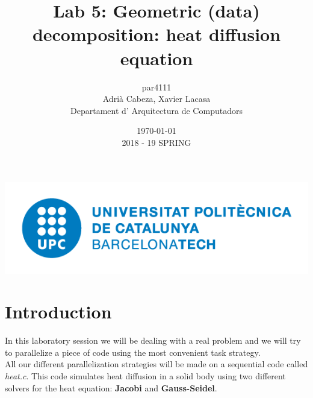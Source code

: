 \documentclass[12]{article}
\author{par4111 \\ Adrià Cabeza, Xavier Lacasa \\ Departament d' Arquitectura de Computadors}
\title{Lab 5: Geometric (data) decomposition: heat diffusion equation}
\date{\today \\ 2018 - 19 SPRING}
\begin{document}
\maketitle

\vspace*{\fill}
\begin{center}
\includegraphics[scale=0.35]{images/UPClogo.png}
\end{center}
\newpage
\tableofcontents
\newpage
\section{Introduction}
In this laboratory session we will be dealing with a real problem and we will try to parallelize a piece of code using the most convenient task strategy. 
\\

All our different parallelization strategies will be made on a sequential code called \textit{heat.c}. This code simulates heat diffusion in a solid body using two different solvers for the heat equation: \textbf{Jacobi} and \textbf{Gauss-Seidel}.
\medskip
\end{document}
